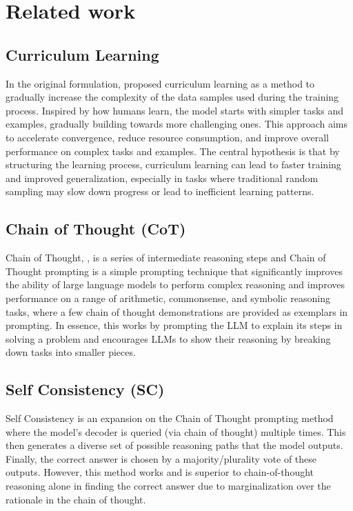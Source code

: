 \section{Related work}

\subsection{Curriculum Learning}
In the original formulation, \citet{Bengio2009CurriculumL} proposed curriculum learning as a method to gradually increase the complexity of the data samples used during the training process. Inspired by how humans learn, the model starts with simpler tasks and examples, gradually building towards more challenging ones. This approach aims to accelerate convergence, reduce resource consumption, and improve overall performance on complex tasks and examples. The central hypothesis is that by structuring the learning process, curriculum learning can lead to faster training and improved generalization, especially in tasks where traditional random sampling may slow down progress or lead to inefficient learning patterns.

\subsection{Chain of Thought (CoT)}
Chain of Thought, \citet{wei2023chainofthoughtpromptingelicitsreasoning}, is a series of intermediate reasoning steps and Chain of Thought prompting is a simple prompting technique that significantly improves the ability of large language models to perform complex reasoning and improves performance on a range of arithmetic, commonsense, and symbolic reasoning tasks, where a few chain of thought demonstrations are provided as exemplars in prompting. In essence, this works by prompting the LLM to explain its steps in solving a problem and encourages LLMs to show their reasoning by breaking down tasks into smaller pieces.

\subsection{Self Consistency (SC)}

Self Consistency \citet{wang2023selfconsistencyimproveschainthought} is an expansion on the Chain of Thought \cite{wei2023chainofthoughtpromptingelicitsreasoning} prompting method where the model's decoder is queried (via chain of thought) multiple times. This then generates a diverse set of possible reasoning paths that the model outputs. Finally, the correct answer is chosen by a majority/plurality vote of these outputs. However, this method works and is superior to chain-of-thought reasoning alone in finding the correct answer due to marginalization over the rationale in the chain of thought.

